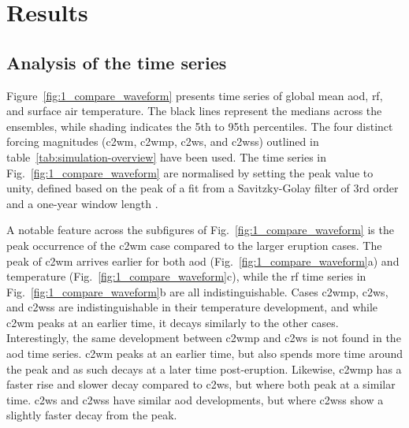 \documentclass{ametsocV6.1}
\begin{document}
\section{Results}\label{sec:results}


\subsection{Analysis of the time series}

Figure~\ref{fig:1_compare_waveform} presents time series of global mean \gls{aod},
\gls{rf}, and surface air temperature. The black lines represent the medians across the
ensembles, while shading indicates the 5th to 95th percentiles. The four distinct
forcing magnitudes (\gls{c2wm}, \gls{c2wmp}, \gls{c2ws}, and \gls{c2wss}) outlined in
table~\ref{tab:simulation-overview} have been used. The time series in
Fig.~\ref{fig:1_compare_waveform} are normalised by setting the peak value to unity,
defined based on the peak of a fit from a Savitzky-Golay filter of 3rd order and a
one-year window length \citep{savitzky1964}.

A notable feature across the subfigures of Fig.~\ref{fig:1_compare_waveform} is the peak
occurrence of the \gls{c2wm} case compared to the larger eruption cases. The peak of
\gls{c2wm} arrives earlier for both \gls{aod} (Fig.~\ref{fig:1_compare_waveform}a) and
temperature (Fig.~\ref{fig:1_compare_waveform}c), while the \gls{rf} time series in
Fig.~\ref{fig:1_compare_waveform}b are all indistinguishable. Cases \gls{c2wmp},
\gls{c2ws}, and \gls{c2wss} are indistinguishable in their temperature development, and
while \gls{c2wm} peaks at an earlier time, it decays similarly to the other cases.
Interestingly, the same development between \gls{c2wmp} and \gls{c2ws} is not found in
the \gls{aod} time series. \gls{c2wm} peaks at an earlier time, but also spends more
time around the peak and as such decays at a later time post-eruption. Likewise,
\gls{c2wmp} has a faster rise and slower decay compared to \gls{c2ws}, but where both
peak at a similar time. \gls{c2ws} and \gls{c2wss} have similar \gls{aod} developments,
but where \gls{c2wss} show a slightly faster decay from the peak.
\end{document}
